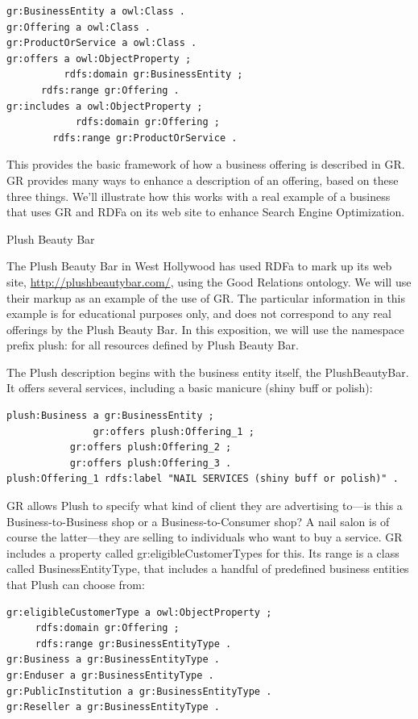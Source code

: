 \begin{lstlisting}
gr:BusinessEntity a owl:Class .
gr:Offering a owl:Class .
gr:ProductOrService a owl:Class .
gr:offers a owl:ObjectProperty ;
          rdfs:domain gr:BusinessEntity ;
	  rdfs:range gr:Offering .
gr:includes a owl:ObjectProperty ;
            rdfs:domain gr:Offering ;
	    rdfs:range gr:ProductOrService .
\end{lstlisting}

This provides the basic framework of how a business offering is
described in GR. GR provides many ways to enhance a description of an
offering, based on these three things. We'll illustrate how this works
with a real example of a business that uses GR and RDFa on its web site
to enhance Search Engine Optimization.

\begin{example}{Plush Beauty Bar}

The Plush Beauty Bar in West Hollywood has used RDFa to mark up its web
site,
\href{http://plushbeautybar.com/\%20}{{http://plushbeautybar.com/}},
using the Good Relations ontology. We will use their markup as an
example of the use of GR. The particular information in this example is
for educational purposes only, and does not correspond to any real
offerings by the Plush Beauty Bar. In this exposition, we will use the
namespace prefix plush: for all resources defined by Plush Beauty Bar.

The Plush description begins with the business entity itself, the
PlushBeautyBar. It offers several services,
including a basic manicure (shiny buff or polish):

\begin{lstlisting}
plush:Business a gr:BusinessEntity ;
               gr:offers plush:Offering_1 ;
	       gr:offers plush:Offering_2 ;
	       gr:offers plush:Offering_3 .
plush:Offering_1 rdfs:label "NAIL SERVICES (shiny buff or polish)" .
\end{lstlisting}

GR allows Plush to specify what kind of client they are advertising
to---is this a Business-to-Business shop or a Business-to-Consumer shop?
A nail salon is of course the latter---they are selling to individuals
who want to buy a service. GR includes a property called
gr:eligibleCustomerTypes for this. Its range is a class called
BusinessEntityType, that includes a handful of predefined business
entities that Plush can choose from:

\begin{lstlisting}
gr:eligibleCustomerType a owl:ObjectProperty ;
     rdfs:domain gr:Offering ;
     rdfs:range gr:BusinessEntityType .
gr:Business a gr:BusinessEntityType .
gr:Enduser a gr:BusinessEntityType .
gr:PublicInstitution a gr:BusinessEntityType .
gr:Reseller a gr:BusinessEntityType .
\end{lstlisting}


\end{example}

